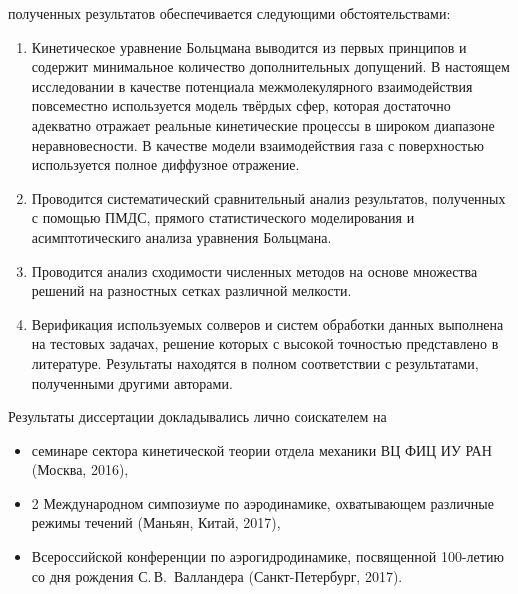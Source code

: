 {\reliability} полученных результатов обеспечивается следующими обстоятельствами:
\begin{enumerate}
    \item Кинетическое уравнение Больцмана выводится из первых принципов и
    содержит минимальное количество дополнительных допущений.
    В настоящем исследовании в качестве потенциала межмолекулярного взаимодействия
    повсеместно используется модель твёрдых сфер,
    которая достаточно адекватно отражает реальные кинетические процессы в широком диапазоне неравновесности.
    В качестве модели взаимодействия газа с поверхностью используется полное диффузное отражение.
    \item Проводится систематический сравнительный анализ результатов,
    полученных с помощью ПМДС, прямого статистического моделирования
    и асимптотическиго анализа уравнения Больцмана.
    \item Проводится анализ сходимости численных методов на основе
    множества решений на разностных сетках различной мелкости.
    \item Верификация используемых солверов и систем обработки данных
    выполнена на тестовых задачах, решение которых с высокой точностью представлено в литературе.
    Результаты находятся в полном соответствии с результатами, полученными другими авторами.
\end{enumerate}

{\probation} Результаты диссертации докладывались лично соискателем на
\begin{itemize}
    \item семинаре сектора кинетической теории отдела механики ВЦ ФИЦ ИУ РАН (Москва, 2016),
    \item 2 Международном симпозиуме по аэродинамике, охватывающем различные режимы течений (Маньян, Китай, 2017),
    \item Всероссийской конференции по аэрогидродинамике, посвященной 100-летию со дня рождения С.\,В.~Валландера (Санкт-Петербург, 2017).
\end{itemize}


